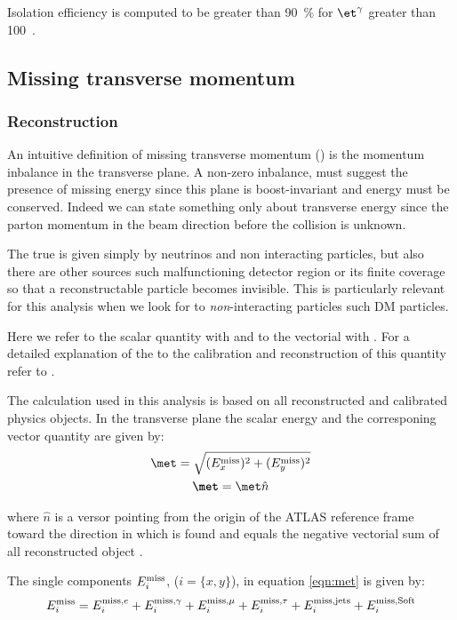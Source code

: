 Isolation efficiency is computed to be greater than \SI{90}{\percent} for $\et^\gamma$ greater than \SI{100}{\gev}~\cite{photonsISO}.


\subsection{Missing transverse momentum}
\label{sec:met}
\subsubsection{Reconstruction}

An intuitive definition of missing transverse momentum (\met) is the momentum inbalance in the transverse plane. A non-zero inbalance, must suggest the presence of missing energy since this plane is boost-invariant and energy must be conserved. Indeed we can state something only about transverse energy since the parton momentum in the beam direction before the collision is unknown.

The true \met is given simply by neutrinos and non interacting particles, but also there are other sources such malfunctioning detector region or its finite coverage so that a reconstructable particle becomes invisible. This is particularly relevant for this analysis when we look for to \emph{non}-interacting particles such DM particles.

Here we refer to the scalar quantity with \met and to the vectorial with \textbf{\met}. For a detailed explanation of the  to the calibration and reconstruction of this quantity refer to \cite{met}.

The \met calculation used in this analysis is based on all reconstructed and calibrated physics objects. In the transverse plane the scalar energy and the corresponing vector quantity are given by:
\begin{gather}
\label{eqn:met}
	\met=\sqrt{(E_x^\textup{miss})^2+(E_y^\textup{miss})^2}\\
	\textbf{\met}=\met \hat{n}
\end{gather}

where $\hat{n}$ is a versor pointing from the origin of the ATLAS reference frame toward the direction in which \met is found and equals the negative vectorial sum of all reconstructed object \pt.

The single components $E_i^\textup{miss}$, ($i=\{x,y\}$), in equation \ref{eqn:met} is given by:
\begin{equation}
	E_i^\textup{miss}=E_i^\textup{miss,$e$}+E_i^\textup{miss,$\gamma$}+E_i^\textup{miss,$\mu$}+E_i^\textup{miss,$\tau$}+E_i^\textup{miss,jets}+E_i^\textup{miss,Soft}
\end{equation}

